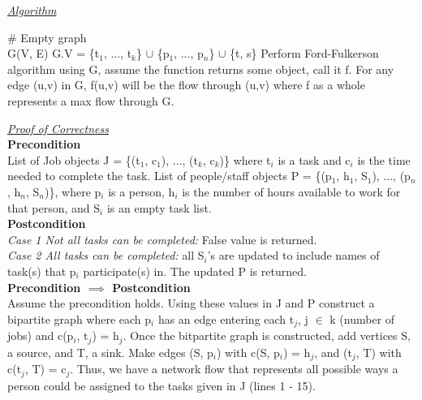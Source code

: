 \documentclass[10pt]{csc_assignment}
\begin{document}
\begin{description}
\emph{\underline{Algorithm}}\\
\begin{algorithm}[H]
 \LinesNumbered 
\# Empty graph\\
G(V, E)\;
G.V = \{t$_{1}$, ..., t$_{k}$\} $\cup$ \{p$_{1}$, ..., p$_{n}$\} $\cup$ \{t, s\}\;
Perform Ford-Fulkerson algorithm using G, assume the function returns some object, call it f. For any edge (u,v) in G, f(u,v) will be the flow through (u,v) where f as a whole represents a max flow through G.\\
\end{algorithm}
\emph{\underline{Proof of Correctness}}\\
\textbf{Precondition}\\
List of Job objects J = \{(t$_{1}$, c$_{1}$), ..., (t$_{k}$, c$_{k}$)\} where t$_{i}$ is a task and c$_{i}$ is the time needed to complete the task. List of people/staff objects P = \{(p$_{1}$, h$_{1}$, S$_{1}$), ..., (p$_{n}$, h$_{n}$, S$_{n}$)\}, where p$_{i}$ is a person, h$_{i}$ is the number of hours available to work for that person, and S$_{i}$ is an empty task list.\\
\textbf{Postcondition}\\
\emph{Case 1 Not all tasks can be completed:} False value is returned.\\
\emph{Case 2 All tasks can be completed:} all S$_{i}$'s are updated to include names of task(s) that p$_{i}$ participate(s) in. The updated P is returned.\\ 
\textbf{Precondition $\implies$ Postcondition}\\ 
Assume the precondition holds. Using these values in J and P construct a bipartite graph where each p$_{i}$ has an edge entering each t$_{j}$, j $\in$ k (number of jobs) and c(p$_{i}$, t$_{j}$) = h$_{j}$. Once the bitpartite graph is constructed, add vertices S, a source, and T, a sink. Make edges (S, p$_{i}$) with c(S, p$_{i}$) = h$_{j}$, and (t$_{j}$, T) with c(t$_{j}$, T) = c$_{j}$. Thus, we have a network flow that represents all possible ways a person could be assigned to the tasks given in J (lines 1 - 15). \\

\end{description}
\end{document}
